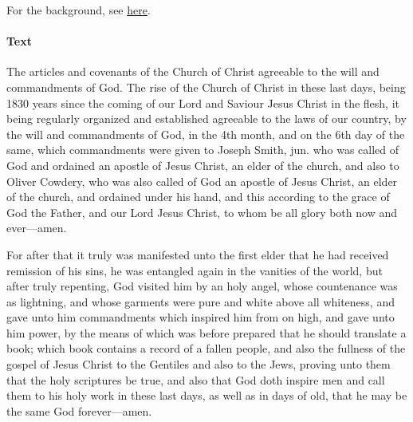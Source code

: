 				For the background, see \hyperref[DC20-HB]{here}.
			
			\paragraph{Text}
			
				The articles and covenants of the Church of Christ agreeable to the will and commandments of God. The rise of the Church of Christ in these last days, being 1830 years since the coming of our Lord and Saviour Jesus Christ in the flesh, it being regularly organized and established agreeable to the laws of our country, by the will and commandments of God, in the 4th month, and on the 6th day of the same, which commandments were given to Joseph Smith, jun. who was called of God and ordained an apostle of Jesus Christ, an elder of the church, and also to Oliver Cowdery, who was also called of God an apostle of Jesus Christ, an elder of the church, and ordained under his hand, and this according to the grace of God the Father, and our Lord Jesus Christ, to whom be all glory both now and ever---amen.
				
				For after that it truly was manifested unto the first elder that he had received remission of his sins, he was entangled again in the vanities of the world, but after truly repenting, God visited him by an holy angel, whose countenance was as lightning, and whose garments were pure and white above all whiteness, and gave unto him commandments which inspired him from on high, and gave unto him power, by the means of which was before prepared that he should translate a book; which book contains a record of a fallen people, and also the fullness of the gospel of Jesus Christ to the Gentiles and also to the Jews, proving unto them that the holy scriptures be true, and also that God doth inspire men and call them to his holy work in these last days, as well as in days of old, that he may be the same God forever---amen.

